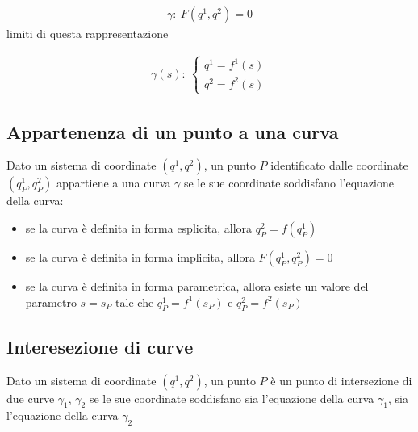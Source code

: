 \documentclass[letterpaper,10pt,english]{jupyterBook}
\begin{document}
\sphinxAtStartPar
{}
\begin{equation*}
\begin{split}\gamma: \ F(q^1, q^2) = 0\end{split}
\end{equation*}
\sphinxAtStartPar
{} limiti di questa rappresentazione

\sphinxAtStartPar
{}
\begin{equation*}
\begin{split}\gamma(s): \ \begin{cases} q^1 = f^1(s) \\ q^2 = f^2(s) \end{cases}\end{split}
\end{equation*}
\sphinxAtStartPar
{} 


\subsection{Appartenenza di un punto a una curva}
\label{\detokenize{ch/analytic_geometry/analytic_geometry_2d/curves:appartenenza-di-un-punto-a-una-curva}}
\sphinxAtStartPar
Dato un sistema di coordinate \((q^1, q^2)\), un punto \(P\) identificato dalle coordinate \((q^1_P, q^2_P)\) appartiene a una curva \(\gamma\) se le sue coordinate soddisfano l’equazione della curva:
\begin{itemize}
\item {} 
\sphinxAtStartPar
se la curva è definita in forma esplicita, allora \(q^2_P = f(q^1_P)\)

\item {} 
\sphinxAtStartPar
se la curva è definita in forma implicita, allora \(F(q^1_P, q^2_P)=0\)

\item {} 
\sphinxAtStartPar
se la curva è definita in forma parametrica, allora esiste un valore del parametro \(s=s_P\) tale che \(q^1_P = f^1(s_P)\) e \(q^2_P = f^2(s_P)\)

\end{itemize}


\subsection{Interesezione di curve}
\label{\detokenize{ch/analytic_geometry/analytic_geometry_2d/curves:interesezione-di-curve}}
\sphinxAtStartPar
Dato un sistema di coordinate \((q^1, q^2)\), un punto \(P\) è un punto di intersezione di due curve \(\gamma_1\), \(\gamma_2\) se le sue coordinate soddisfano sia l’equazione della curva \(\gamma_1\), sia l’equazione della curva \(\gamma_2\)
\end{document}
